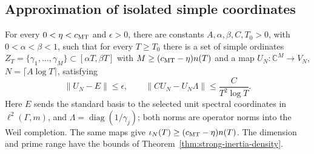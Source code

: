 \subsection{Approximation of isolated simple coordinates}

\begin{theorem}
\label{thm:fd-inertia-density}
For every \(0<\eta<c_{\rm MT}\) and \(\epsilon>0\), there are
constants \(A,\alpha,\beta,C,T_0>0\), with \(0<\alpha<\beta<1\),
such that for every \(T\ge T_0\) there is a set of simple ordinates
\(Z_T=\{\gamma_1,\ldots,\gamma_M\}\subset[\alpha T,\beta T]\)
with \(M\ge(c_{\rm MT}-\eta)n(T)\) and a map
\(U_N:\mathbb C^M\to V_N\), \(N=\lceil A\log T\rceil\), satisfying
\[
 \|U_N-E\|\le\epsilon,
 \qquad
 \|CU_N-U_N\Lambda\|\le\frac{C}{T^2\log T}.
\]
Here \(E\) sends the standard basis to the selected unit spectral
coordinates in \(\ell^2(\Gamma,m)\), and
\(\Lambda=\operatorname{diag}(1/\gamma_j)\); both norms are operator
norms into the Weil completion. The same maps give
\(\iota_N(T)\ge(c_{\rm MT}-\eta)n(T)\).
The dimension and prime range have the bounds of
Theorem~\ref{thm:strong-inertia-density}.
\end{theorem}

